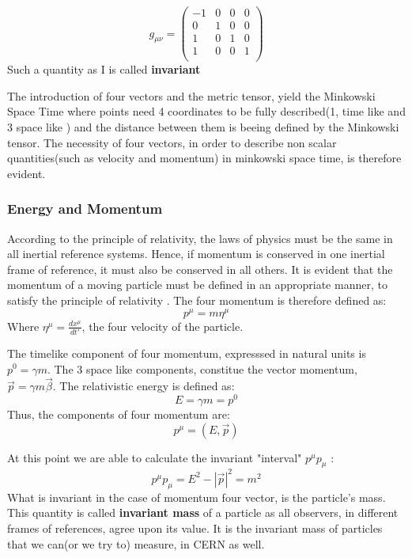 \begin{equation}
g_{\mu \nu} = \begin{pmatrix}
-1 & 0 & 0 & 0\\
0 & 1 & 0 & 0\\
1 & 0 & 1 & 0\\
1 & 0 & 0 & 1\\
\end{pmatrix}
\end{equation}
Such a quantity as I is called \textbf{invariant}

The introduction of four vectors and the metric tensor, yield the Minkowski Space Time where points need 4 coordinates to be fully described(1, time like and 3 space like ) and the distance between them is beeing defined by the Minkowski tensor. The necessity of four vectors, in order to describe non scalar quantities(such as velocity and momentum) in minkowski space time, is therefore evident.

\subsubsection{Energy and Momentum}
\label{sec:org15fe0da}

According to the principle of relativity, the laws of physics must be the same in all inertial reference systems. Hence, if momentum is conserved  in one inertial frame of reference, it must also be conserved in all others. It is evident that the momentum of a moving particle must be defined in an appropriate manner, to satisfy the principle of relativity \cite{gParticles}. The four momentum is therefore defined as:
\begin{equation}
p^{\mu} = m\eta^{\mu}
\end{equation}
Where \(\eta^{\mu} = \frac{dx^{\mu}}{dt'}\), the four velocity of the particle.

The timelike component of four momentum, expresssed in natural units  is \(p^{0} = \gamma m\). The 3 space like components, constitue the vector momentum, \(\vec{p} = \gamma m\vec{\beta}\).
The relativistic energy is defined as:
\begin{equation}
E = \gamma m = p^{0}
\end{equation}
Thus, the components of four momentum are:
\begin{equation}
p^{\mu} = (E, \vec{p})
\end{equation}

At this point we are able to calculate the invariant "interval" \(p^{\mu}p_{\mu}\) :
\begin{equation}
p^{\mu}p_{\mu} = E^{2} - |\vec{p}|^{2} = m^{2}
\end{equation}
What is invariant in the case of momentum four vector, is the particle's mass. This quantity is called \textbf{invariant mass} of a particle as all observers, in different frames of references, agree upon its value. It is the invariant mass of particles that we can(or we try to) measure, in CERN as well. 

